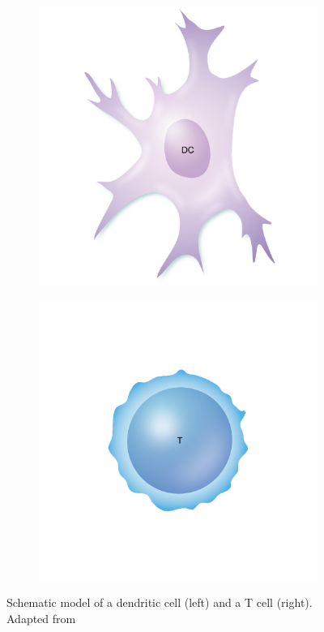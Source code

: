 \begin{figure}[h]
    \centering
    \begin{subfigure}[h!]{0.3\textwidth}
        \includegraphics[width=\textwidth]{dissertation/figures/model_DC.png}
    \end{subfigure}
    \begin{subfigure}[h!]{0.3\textwidth}
        \includegraphics[width=\textwidth]{dissertation/figures/model_Tcell.png}
    \end{subfigure}
    \caption{Schematic model of a dendritic cell (left) and a T cell (right). Adapted from \cite{https://www.immunology.org/public-information/bitesized-immunology/systems-and-processes/t-cell-activation}}
    \label{eval:graphs}
\end{figure}

